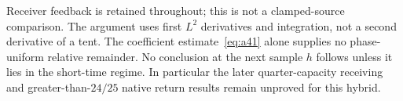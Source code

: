 Receiver feedback is retained throughout; this is not a clamped-source comparison. The argument uses first $L^2$ derivatives and integration, not a second derivative of a tent. The coefficient estimate~\eqref{eq:a41} alone supplies no phase-uniform relative remainder. No conclusion at the next sample $h$ follows unless it lies in the short-time regime. In particular the later quarter-capacity receiving and greater-than-$24/25$ native return results remain unproved for this hybrid.
